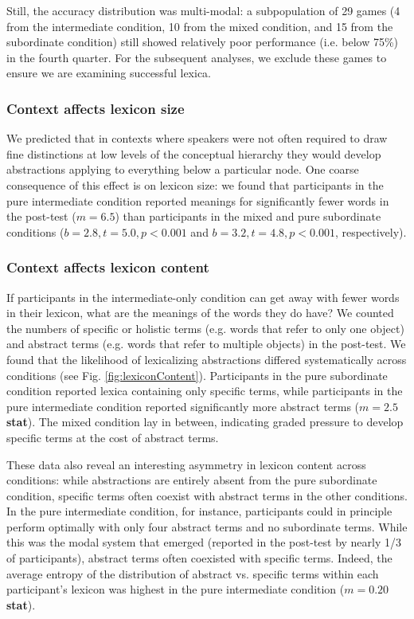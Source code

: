 \documentclass[10pt,letterpaper]{article}
\begin{document}
Still, the accuracy distribution was multi-modal: a subpopulation of 29 games (4 from the intermediate condition, 10 from the mixed condition, and 15 from the subordinate condition) still showed relatively poor  performance (i.e. below 75\%) in the fourth quarter. For the subsequent analyses, we exclude these games to ensure we are examining successful lexica.

\subsubsection{Context affects lexicon size}

We predicted that in contexts where speakers were not often required to draw fine distinctions at low levels of the conceptual hierarchy they would develop abstractions applying to everything below a particular node. One coarse consequence of this effect is on lexicon size: we found that participants in the pure intermediate condition reported meanings for significantly fewer words in the post-test ($m = 6.5$) than participants in the mixed and pure subordinate conditions ($b = 2.8, t = 5.0, p <0.001$ and $b = 3.2, t = 4.8, p < 0.001$, respectively). 

\subsubsection{Context affects lexicon content}


If participants in the intermediate-only condition can get away with fewer words in their lexicon, what are the meanings of the words they do have? We counted the numbers of specific or holistic terms (e.g. words that refer to only one object) and abstract terms (e.g. words that refer to multiple objects) in the post-test. We found that the likelihood of lexicalizing abstractions differed systematically across conditions (see Fig. \ref{fig:lexiconContent}). Participants in the pure subordinate condition reported lexica containing only specific terms, while participants in the pure intermediate condition reported significantly more abstract terms ($m = 2.5$ \textbf{stat}). The mixed condition lay in between, indicating graded pressure to develop specific terms at the cost of abstract terms. 

These data also reveal an interesting asymmetry in lexicon content across conditions: while abstractions are entirely absent from the pure subordinate condition, specific terms often coexist with abstract terms in the other conditions. In the pure intermediate condition, for instance, participants could in principle perform optimally with only four abstract terms and no subordinate terms. While this was the modal system that emerged (reported in the post-test by nearly 1/3 of participants), abstract terms often coexisted with specific terms. Indeed, the average entropy of the distribution of abstract vs. specific terms within each participant's lexicon was highest in the pure intermediate condition ($m = 0.20$ \textbf{stat}). 
\end{document}
